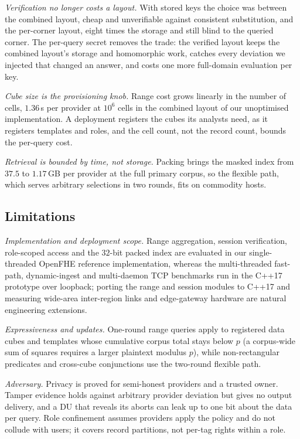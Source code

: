 \documentclass[a4paper,fleqn]{cas-sc}
\begin{document}
\emph{Verification no longer costs a layout.} With stored keys the choice was
between the combined layout, cheap and unverifiable against consistent
substitution, and the per-corner layout, eight times the storage and still
blind to the queried corner. The per-query secret removes the trade: the
verified layout keeps the combined layout's storage and homomorphic work,
catches every deviation we injected that changed an answer, and costs one more
full-domain evaluation per key.

\emph{Cube size is the provisioning knob.} Range cost grows linearly in the
number of cells, $1.36$\,s per provider at $10^6$ cells in the combined layout
of our unoptimised implementation. A deployment registers the cubes its
analysts need, as it registers templates and roles, and the cell count, not the
record count, bounds the per-query cost.

\emph{Retrieval is bounded by time, not storage.} Packing brings the masked
index from $37.5$ to $1.17$\,GB per provider at the full primary corpus, so the
flexible path, which serves arbitrary selections in two rounds, fits on
commodity hosts.

\subsection{Limitations}
\label{sec:limits}
\emph{Implementation and deployment scope.} Range aggregation, session
verification, role-scoped access and the $32$-bit packed index are evaluated
in our single-threaded OpenFHE reference implementation, whereas the
multi-threaded fast-path, dynamic-ingest and multi-daemon TCP benchmarks run
in the C++17 prototype over loopback; porting the range and session modules to
C++17 and measuring wide-area inter-region links and edge-gateway hardware
are natural engineering extensions.

\emph{Expressiveness and updates.} One-round range queries apply to registered
data cubes and templates whose cumulative corpus total stays below $p$ (a
corpus-wide sum of squares requires a larger plaintext modulus $p$), while
non-rectangular predicates and cross-cube conjunctions use the two-round
flexible path.

\emph{Adversary.} Privacy is proved for semi-honest providers and a trusted
owner. Tamper evidence holds against arbitrary provider deviation but gives no
output delivery, and a DU that reveals its aborts can leak up to one bit about
the data per query. Role confinement assumes providers apply the policy and do
not collude with users; it covers record partitions, not per-tag rights within
a role.
\end{document}
